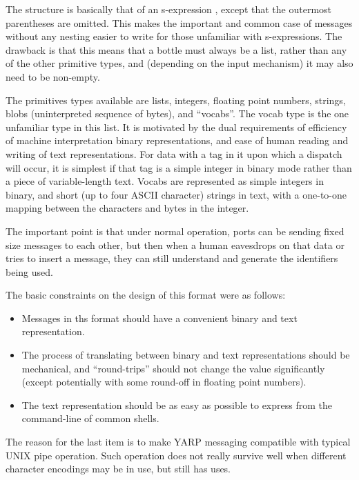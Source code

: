 The structure is basically that of an s-expression
\cite{rivest1997sexp}, except that the outermost parentheses are
omitted.  This makes the important and common case of messages without
any nesting easier to write for those unfamiliar with s-expressions.
The drawback is that this means that a bottle must always be a list,
rather than any of the other primitive types, and (depending on the
input mechanism) it may also need to be non-empty.

The primitives types available are lists, integers, floating point
numbers, strings, blobs (uninterpreted sequence of bytes), and
``vocabs''.  The vocab type is the one unfamiliar type in this list.
It is motivated by the dual requirements of efficiency of machine
interpretation binary representations, and ease of human reading and
writing of text representations.  For data with a tag in it upon which
a dispatch will occur, it is simplest if that tag is a simple integer
in binary mode rather than a piece of variable-length text.
Vocabs are represented as simple integers in binary, and short
(up to four ASCII character) strings in text, with a one-to-one
mapping between the characters and bytes in the integer.  


The important point is that under normal operation, ports can be
sending fixed size messages to each other, but then when a human
eavesdrops on that data or tries to insert a message, they can still
understand and generate the identifiers being used.


The basic constraints on the design of this format were as follows:

\begin{itemize} \pflist

\item Messages in ths format should have a convenient binary and text
representation.

\item The process of translating between binary and text
representations should be mechanical, and ``round-trips'' should not
change the value significantly (except potentially with some round-off
in floating point numbers).

\item The text representation should be as easy as possible
to express from the command-line of common shells.

\end{itemize}

The reason for the last item is to make YARP messaging compatible
with typical UNIX pipe operation.  Such operation does not 
really survive well when different character encodings may be
in use, but still has uses.



